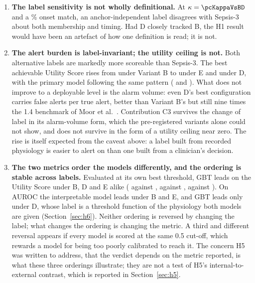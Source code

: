 \begin{enumerate}
    \item \textbf{The label sensitivity is not wholly definitional.} At
    $\kappa = \pcKappaVsBD$ and a \pcPctExactMatchD\% onset match, an
    anchor-independent label
    disagrees with Sepsis-3 about both membership and timing. Had D closely
    tracked B, the H1 result would have been an artefact of how one definition
    is read; it is not.

    \item \textbf{The alert burden is label-invariant; the utility ceiling is
    not.} Both alternative labels are markedly more scoreable than Sepsis-3.
    The best achievable Utility Score rises from \pcUtilityMaxGbtB{} under
    Variant B to \pcUtilityMaxGbtE{} under E and \pcUtilityMaxGbtD{} under D,
    with the primary model following the same pattern
    (\pcUtilityMaxPrimaryE{} and \pcUtilityMaxPrimaryD). What does not improve
    to a deployable level is the alarm volume: even D's best configuration
    carries \pcUtilityOptBurdenGbtD{} false alerts per true alert, better than
    Variant B's \pcUtilityOptBurdenGbtB{} but still nine times the 1.4
    benchmark of Moor et al.\ \cite{moor2023review}. Contribution C3 survives
    the change of label in its alarm-volume form, which the pre-registered
    variants alone could not show, and does not survive in the form of a
    utility ceiling near zero. The rise is itself expected from the caveat
    above: a label built from recorded physiology is easier to alert on than
    one built from a clinician's decision.

    \item \textbf{The two metrics order the models differently, and the
    ordering is stable across labels.} Evaluated at its own best threshold, GBT
    leads on the Utility Score under B, D and E alike
    (\pcUtilityMaxGbtB{} against \pcUtilityMaxPrimaryB, \pcUtilityMaxGbtD{}
    against \pcUtilityMaxPrimaryD, \pcUtilityMaxGbtE{} against
    \pcUtilityMaxPrimaryE). On AUROC the interpretable model leads under B and
    E, and GBT leads only under D, whose label is a threshold function of the
    physiology both models are given (Section~\ref{sec:h6}). Neither ordering
    is reversed by changing the label; what changes the ordering is changing
    the metric. A third and different reversal appears if every model is scored
    at the same 0.5 cut-off, which rewards a model for being too poorly
    calibrated to reach it. The concern H5 was written to address, that the
    verdict depends on the metric reported, is what these three orderings
    illustrate; they are not a test of H5's internal-to-external contrast,
    which is reported in Section~\ref{sec:h5}.
\end{enumerate}

